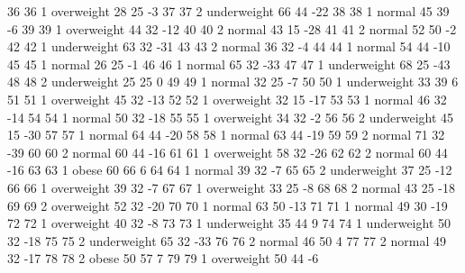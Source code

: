 \begin{Schunk}
\begin{Soutput}
36           36   1  overweight  28         25           -3
37           37   2 underweight  66         44          -22
38           38   1      normal  45         39           -6
39           39   1  overweight  44         32          -12
40           40   2      normal  43         15          -28
41           41   2      normal  52         50           -2
42           42   1 underweight  63         32          -31
43           43   2      normal  36         32           -4
44           44   1      normal  54         44          -10
45           45   1      normal  26         25           -1
46           46   1      normal  65         32          -33
47           47   1 underweight  68         25          -43
48           48   2 underweight  25         25            0
49           49   1      normal  32         25           -7
50           50   1 underweight  33         39            6
51           51   1  overweight  45         32          -13
52           52   1  overweight  32         15          -17
53           53   1      normal  46         32          -14
54           54   1      normal  50         32          -18
55           55   1  overweight  34         32           -2
56           56   2 underweight  45         15          -30
57           57   1      normal  64         44          -20
58           58   1      normal  63         44          -19
59           59   2      normal  71         32          -39
60           60   2      normal  60         44          -16
61           61   1  overweight  58         32          -26
62           62   2      normal  60         44          -16
63           63   1       obese  60         66            6
64           64   1      normal  39         32           -7
65           65   2 underweight  37         25          -12
66           66   1  overweight  39         32           -7
67           67   1  overweight  33         25           -8
68           68   2      normal  43         25          -18
69           69   2  overweight  52         32          -20
70           70   1      normal  63         50          -13
71           71   1      normal  49         30          -19
72           72   1  overweight  40         32           -8
73           73   1 underweight  35         44            9
74           74   1 underweight  50         32          -18
75           75   2 underweight  65         32          -33
76           76   2      normal  46         50            4
77           77   2      normal  49         32          -17
78           78   2       obese  50         57            7
79           79   1  overweight  50         44           -6

\end{Soutput}
\end{Schunk}
